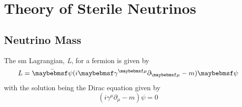 \section{Theory of Sterile Neutrinos}\label{subchap:Theory of Sterile Neutrinos}
\subsection{Neutrino Mass}\label{subsec:Neutrino Mass}
The \gls{sm} Lagrangian, \textit{L}, for a fermion is given by
\begin{equation}\label{eqn:SM Lagrangian}
    L = \Bar{\psi}(i\gamma^{\mu} \partial_{\mu} - m)\psi
\end{equation}
with the solution being the Dirac equation given by
\begin{equation}
    (i\gamma^\mu\partial_\mu - m)\psi = 0
\end{equation}
